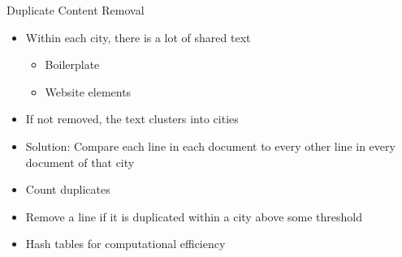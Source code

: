 \documentclass[12pt]{beamer}
\begin{document}
\begin{frame}{Duplicate Content Removal}
\begin{itemize}
	\item Within each city, there is a lot of shared text
	\begin{itemize}
		\item Boilerplate
		\item Website elements
	\end{itemize}
	\item If not removed, the text clusters into cities
\end{itemize}
\begin{itemize}
	\item Solution: Compare each line in each document to every other line in every document of that city
	\item Count duplicates
	\item Remove a line if it is duplicated within a city above some threshold
	\item Hash tables for computational efficiency
\end{itemize}
\end{frame}
\end{document}
